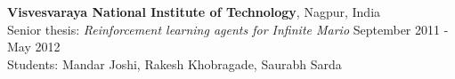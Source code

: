 \documentclass[margin,line,11pt]{res}
\begin{document}
\begin{resume}
                  \textbf{Visvesvaraya National Institute of
                    Technology}, Nagpur, India\\ Senior thesis:
                  \emph{Reinforcement learning agents for Infinite
                    Mario} \hfill September 2011 - May
                  2012\\ Students: Mandar Joshi, Rakesh Khobragade,
                  Saurabh Sarda\\





\end{resume}
\end{document}
